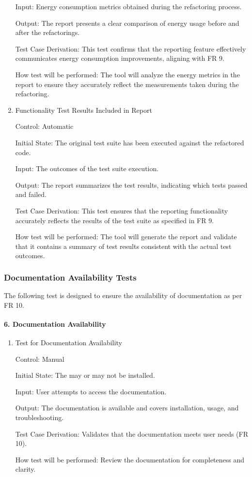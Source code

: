 \documentclass[12pt, titlepage]{article}
\begin{document}
\begin{enumerate}
Input: Energy consumption metrics obtained during the refactoring process.

Output: The report presents a clear comparison of energy usage before and after the refactorings.

Test Case Derivation: This test confirms that the reporting feature effectively communicates energy consumption improvements, aligning with FR 9.

How test will be performed: The tool will analyze the energy metrics in the report to ensure they accurately reflect the measurements taken during the refactoring.


\item{Functionality Test Results Included in Report\\}

Control: Automatic

Initial State: The original test suite has been executed against the refactored code.

Input: The outcomes of the test suite execution.

Output: The report summarizes the test results, indicating which tests passed and failed.

Test Case Derivation: This test ensures that the reporting functionality accurately reflects the results of the test suite as specified in FR 9.

How test will be performed: The tool will generate the report and validate that it contains a summary of test results consistent with the actual test outcomes.

\end{enumerate}


\subsubsection{Documentation Availability Tests}

The following test is designed to ensure the availability of documentation as per FR 10.
		
\paragraph{6. Documentation Availability}
\begin{enumerate}
  \item{Test for Documentation Availability\\}

  Control: Manual
  
  Initial State: The may or may not be installed.
  
  Input: User attempts to access the documentation.
  
  Output: The documentation is available and covers installation, usage, and troubleshooting.
  
  Test Case Derivation: Validates that the documentation meets user needs (FR 10).
  
  How test will be performed: Review the documentation for completeness and clarity.
\end{enumerate}
\end{document}
